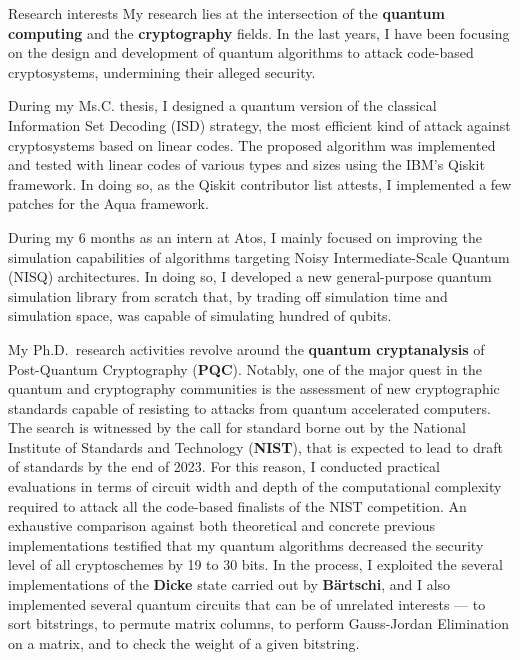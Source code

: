 \documentclass{resume} %
\begin{document}
\begin{rSection}{Research interests}
  My research lies at the intersection of the \textbf{quantum computing} and the
  \textbf{cryptography} fields. In the last years, I have been focusing on the
  design and development of quantum algorithms to attack code-based
  cryptosystems, undermining their alleged security.

  During my Ms.C. thesis, I designed a quantum version of the classical
  Information Set Decoding (ISD) strategy, the most efficient kind of attack
  against cryptosystems based on linear codes. The proposed algorithm was
  implemented and tested with linear codes of various types and sizes using the
  IBM's Qiskit framework. In doing so, as the Qiskit contributor list attests, I
  implemented a few patches for the Aqua framework.

  During my 6 months as an intern at Atos, I mainly focused on improving the
  simulation capabilities of algorithms targeting Noisy Intermediate-Scale
  Quantum (NISQ) architectures. In doing so, I developed a new
  general-purpose quantum simulation library from scratch that, by trading off simulation
  time and simulation space, was capable of simulating hundred of qubits.

  My Ph.D.\ research activities revolve around the \textbf{quantum
    cryptanalysis} of Post-Quantum Cryptography (\textbf{PQC}). Notably, one of
  the major quest in the quantum and cryptography communities is the assessment
  of new cryptographic standards capable of resisting to attacks from quantum
  accelerated computers. The search is witnessed by the call for standard borne
  out by the National Institute of Standards and Technology (\textbf{NIST}),
  that is expected to lead to draft of standards by the end of 2023. For this
  reason, I conducted practical evaluations in terms of circuit width and depth
  of the computational complexity required to attack all the code-based
  finalists of the NIST competition. An exhaustive comparison against both
  theoretical and concrete previous implementations testified that my quantum
  algorithms decreased the security level of all cryptoschemes by 19 to 30 bits.
  In the process, I exploited the several implementations of the \textbf{Dicke}
  state carried out by \textbf{B{\"a}rtschi}, and I also implemented several
  quantum circuits that can be of unrelated interests --- to sort bitstrings, to
  permute matrix columns, to perform Gauss-Jordan Elimination on a matrix, and
  to check the weight of a given bitstring.


\end{rSection}
\end{document}

